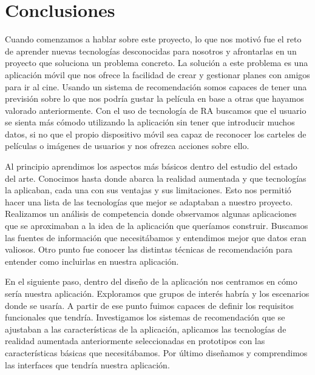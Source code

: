 
\cleardoublepage


\chapter{Conclusiones}
\label{makereference5}
Cuando comenzamos a hablar sobre este proyecto, lo que nos motivó fue el
 reto de aprender nuevas tecnologías desconocidas para nosotros y afrontarlas
 en un proyecto que soluciona un problema concreto. La solución a este problema
 es una aplicación móvil que nos ofrece la facilidad de crear y gestionar
 planes con amigos para ir al cine. Usando un sistema de recomendación somos
 capaces de tener una previsión sobre lo que nos podría gustar la película en
 base a otras que hayamos valorado anteriormente.
 Con el uso de tecnología de RA buscamos que el usuario se sienta más cómodo
 utilizando la aplicación sin tener que introducir muchos datos, si no que el propio
 dispositivo móvil sea capaz de reconocer los carteles de películas o imágenes
 de usuarios y nos ofrezca acciones sobre ello.

Al principio aprendimos los aspectos más básicos dentro del estudio del
 estado del arte. Conocimos hasta donde abarca la realidad aumentada
  y que tecnologías la aplicaban, cada una con sus ventajas y sus
 limitaciones. Esto nos permitió hacer una lista de las tecnologías
 que mejor se adaptaban a nuestro proyecto. Realizamos un análisis de
 competencia donde observamos algunas aplicaciones que se aproximaban a la
 idea de la aplicación que queríamos construir. Buscamos las fuentes de
 información que necesitábamos y entendimos mejor que datos eran valiosos.
 Otro punto fue conocer las distintas técnicas de recomendación para entender como incluirlas en nuestra aplicación. 

En el siguiente paso, dentro del diseño de la aplicación nos centramos en
 cómo sería nuestra aplicación. Exploramos que grupos de interés habría y
 los escenarios donde se usaría. A partir de ese punto fuimos capaces de
 definir los requisitos funcionales que tendría. Investigamos los sistemas
 de recomendación que se ajustaban a las características de la aplicación,
 aplicamos las tecnologías de realidad aumentada anteriormente
 seleccionadas en prototipos con las características básicas que
 necesitábamos. Por último diseñamos y comprendimos las interfaces que
 tendría nuestra aplicación. 

